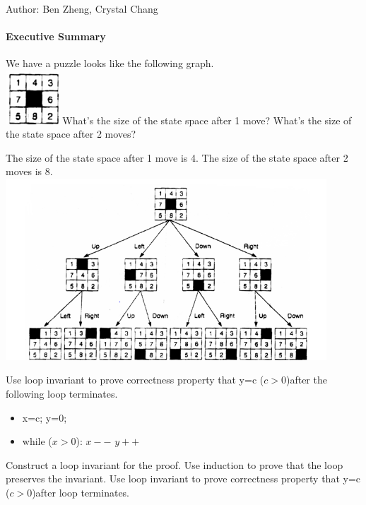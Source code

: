 \documentclass[solution, letterpaper]{cs20inclass}
\begin{document}

\noindent Author: Ben Zheng, Crystal Chang

\paragraph*{Executive Summary}

\problem We have a puzzle looks like the following graph.\\
\includegraphics[width=2cm]{initial}
\subproblem What's the size of the state space after 1 move?
\subproblem What's the size of the state space after 2 moves?

\begin{solution}
\subsolution The size of the state space after 1 move is 4.
\subsolution The size of the state space after 2 moves is 8.\\
\includegraphics[width=12cm]{final8}
\end{solution}

\problem Use loop invariant to prove correctness property that y=c ($c>0$)after the following loop terminates.
\begin{itemize}
\item x=c; y=0;
\item while ($x>0$):
\subitem $x--$
\subitem $y++$
\end{itemize}
\subproblem Construct a loop invariant for the proof.
\subproblem Use induction to prove that the loop preserves the invariant.
\subproblem Use loop invariant to prove correctness property that y=c ($c>0$)after loop terminates.
\end{document}
